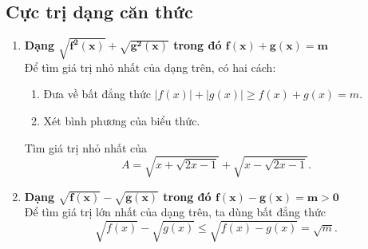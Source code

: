 \subsection{Cực trị dạng căn thức}
 	\begin{enumerate}[1.]
 		\item \textbf{Dạng $\mathbf{\sqrt{f^2(x)}+\sqrt{g^2(x)}}$ trong đó $\mathbf{f(x)+g(x) =m}$}\\
 		Để tìm giá trị nhỏ nhất của dạng trên, có hai cách:
 		\begin{enumerate}[--]
 			\item Đưa về bất đẳng thức $|f(x)|+|g(x)|\geq f(x) +g(x)=m.$
 			\item Xét bình phương của biểu thức.
 		\end{enumerate}
 		\begin{vd}
 			Tìm giá trị nhỏ nhất của \[A=\sqrt{x+\sqrt{2x-1}}+\sqrt{x- \sqrt{2x-1}}. \]
 		\end{vd}
 		\item \textbf{Dạng $\mathbf{\sqrt{f(x)}-\sqrt{g(x)}}$ trong đó $\mathbf{f(x)-g(x)=m>0}$ }\\
 		Để tìm giá trị lớn nhất của dạng trên, ta dùng bất đẳng thức \[ \sqrt{f(x)}-\sqrt{g(x)} \leq \sqrt{f(x)-g(x)}=\sqrt{m}.\]

\end{enumerate}
